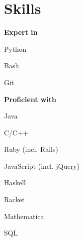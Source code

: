 \section{Skills}
\textbf{Expert in}
\vspace{\topsep} %
\begin{tightemize}
\item Python
\item Bash
\item Git
\end{tightemize}
\sectionsep

\textbf{Proficient with}
\begin{tightemize}
\item Java
\item C/C++
\item Ruby (incl. Rails)
\item JavaScript (incl. jQuery)
\item Haskell
\item Racket
\item Mathematica
\item SQL
\end{tightemize}
\sectionsep
